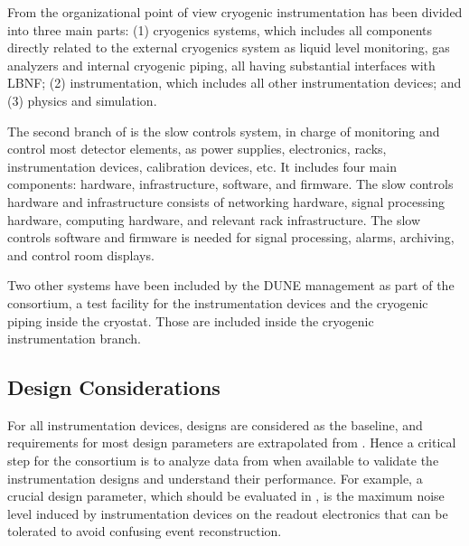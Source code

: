 From the organizational point of view
cryogenic instrumentation has been divided into three main parts: (1) cryogenics systems, which includes all components directly related to the external cryogenics system as
liquid level monitoring, gas analyzers and internal cryogenic piping, all having substantial interfaces with LBNF; (2) \lar  instrumentation, which includes all
other instrumentation devices; and (3) physics and simulation.


The second branch of  is the slow controls system, in charge of monitoring and control most detector elements, as power supplies, electronics, racks, instrumentation devices,
calibration devices, etc. It includes four main components: hardware, infrastructure,
software, and firmware. The slow controls hardware and infrastructure consists of
networking hardware, signal processing hardware, computing hardware, and relevant
rack infrastructure. The slow controls software and firmware is needed for
signal processing, alarms, archiving, and control room displays.

Two other systems have been included by the DUNE management as part of the  consortium,
a test facility for the instrumentation devices and the cryogenic piping inside the cryostat.
Those are included inside the cryogenic instrumentation branch.



\subsection{Design Considerations}
\label{sec:fddp-slow-cryo-des-consid}


For all \lar instrumentation devices,  designs are
considered as the baseline, and requirements for most design
parameters are extrapolated from . Hence a critical step for
the  consortium is to analyze data from  when available
to validate the instrumentation designs and understand their
performance. For example, a crucial design parameter, which should be evaluated in ,
is the maximum noise level induced by instrumentation devices on the readout electronics that can be tolerated to avoid confusing event reconstruction. 

